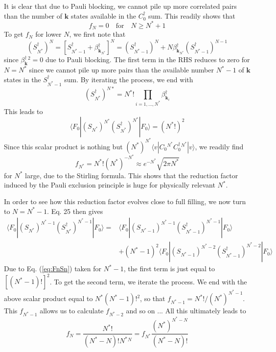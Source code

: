 \documentclass[aps,prb,preprint,groupedaddress,amsmath]{revtex4-1}
\newcommand{\vk}{\ensuremath{\mathbf{k}}}
\newcommand{\dg}{\ensuremath{\dagger}}
\begin{document}
It is clear that due to Pauli blocking, we cannot pile up more correlated pairs than the number of $\vk$ states available in the $C^\dg_0$ sum.  This readily shows that
\begin{equation}
f_N=0\quad \mbox{for}\quad N\geq{}N^*+1
\end{equation}
To get $f_N$ for lower $N$, 
we first note that 
\begin{equation}
(S_{N^*}^\dg)^{N}=[S^\dg_{N^*-1}+\beta^\dg_{\vk_{N^*}}]^{N}=(S_{N^*-1}^\dg)^{N}+N\beta^\dg_{\vk_{N^*}}(S_{N^*-1}^\dg)^{N-1}
\end{equation}
since $\beta^\dg_\vk{}^2=0$ due to Pauli blocking.
The first term in the RHS reduces to zero for $N=N^*$ since we cannot pile up more pairs than the available number $N^*-1$ of $\vk$ states in the $S^\dg_{N^*-1}$ sum. By iterating the process, we end with 
\begin{equation}
(S^\dg_{N^*})^{N*}=N^*!\prod_{i=1,\dots,N^*}\beta_{\vk_i}^\dg
\end{equation}
 This leads to 
\begin{equation}\label{eq:FnSn}
\langle{F_0}|(S_{N^*}^{})^{N^*}(S_{N^*}^\dg)^{N^*}|F_0\rangle=(N^*!)^2
\end{equation}
Since this scalar product is nothing but $(N^*)^{N^*}\langle{}v|C_0{}^{N^*}C_0^\dg{}^{N^*}|v\rangle$, we readily find
 \begin{equation}
f_{N^*}=N^*!(N^*)^{-N^*}\approx{}e^{-N^*}\sqrt{2\pi{N^*}}
\end{equation}
 for $N^*$ large, due to the Stirling formula. This shows that the reduction factor induced by the Pauli exclusion principle is huge for physically relevant $N^*$.
 
 In order to see how this reduction factor evolves close to full filling, we now turn to $N=N^*-1$. Eq. 25 then gives 
 \begin{equation}
 \begin{split}
\langle{F_0}|(S_{N^*}^{})^{N^*-1}(S_{N^*}^\dg)^{N^*-1}|F_0\rangle
=&\langle{F_0}|(S_{N^*-1}^{})^{N^*-1}(S_{N^*-1}^\dg)^{N^*-1}|F_0\rangle\\
&+(N^*-1)^2\langle{F_0}|(S_{N^*-1}^{})^{N^*-2}(S_{N^*-1}^\dg)^{N^*-2}|F_0\rangle
\end{split}
\end{equation} 
Due to Eq. (\ref{eq:FnSn}) taken for $N^*-1$, the first term is just equal to $[(N^*-1)!]^2$. To get the second term, we iterate the process. We end with the above scalar product equal to $N^*(N^*-1)!^2$, so that $f_{N^*-1}=N^*!/(N^*)^{N^*-1}$.  This $f_{N^*-1}$ allows us to calculate $f_{N^*-2}$ and so on ...  All this ultimately leads to
\begin{equation}\label{eq:fN}
f_N=\frac{N^*!}{(N^*-N)!N^*{}^N}=f_{N^*}\frac{(N^*)^{N^*-N}}{(N^*-N)!}
\end{equation}
\end{document}
